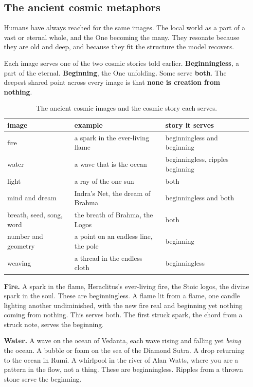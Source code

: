 \subsection{The ancient cosmic metaphors}

Humans have always reached for the same images. The local world as a part of a vast or eternal whole, and the One becoming the many. They resonate because they are old and deep, and because they fit the structure the model recovers.

Each image serves one of the two cosmic stories told earlier. \textbf{Beginningless}, a part of the eternal. \textbf{Beginning}, the One unfolding. Some serve \textbf{both}. The deepest shared point across every image is that \textbf{none is creation from nothing}.

\begin{table}[ht]
\centering
\begin{tabular}{@{}lll@{}}
\toprule
image & example & story it serves \\
\midrule
fire & a spark in the ever-living flame & beginningless and beginning \\
water & a wave that is the ocean & beginningless, ripples beginning \\
light & a ray of the one sun & both \\
mind and dream & Indra's Net, the dream of Brahma & beginningless and both \\
breath, seed, song, word & the breath of Brahma, the Logos & both \\
number and geometry & a point on an endless line, the pole & beginning \\
weaving & a thread in the endless cloth & beginningless \\
\bottomrule
\end{tabular}
\caption{The ancient cosmic images and the cosmic story each serves.}
\label{tab:cosmic-images}
\end{table}

\textbf{Fire.} A spark in the flame, Heraclitus's ever-living fire, the Stoic logos, the divine spark in the soul. These are beginningless. A flame lit from a flame, one candle lighting another undiminished, with the new fire real and beginning yet nothing coming from nothing. This serves both. The first struck spark, the chord from a struck note, serves the beginning.

\textbf{Water.} A wave on the ocean of Vedanta, each wave rising and falling yet \emph{being} the ocean. A bubble or foam on the sea of the Diamond Sutra. A drop returning to the ocean in Rumi. A whirlpool in the river of Alan Watts, where you are a pattern in the flow, not a thing. These are beginningless. Ripples from a thrown stone serve the beginning.

